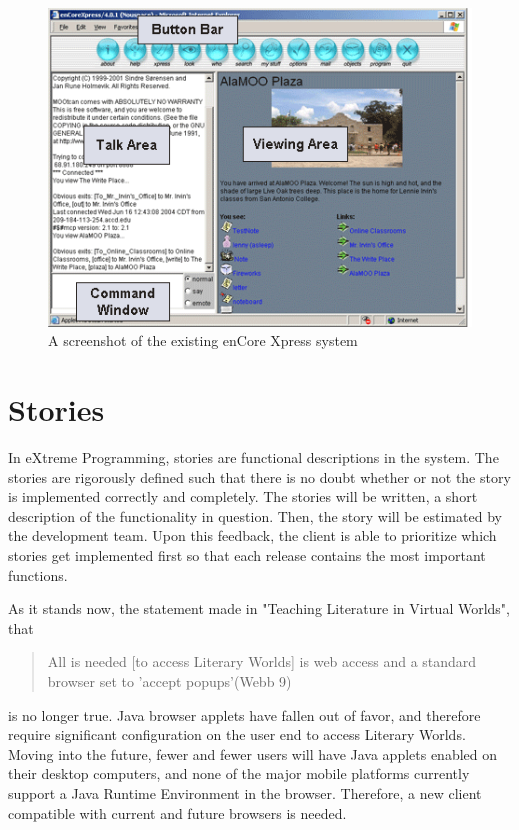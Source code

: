 \documentclass[12pt, letterpaper]{report}
\begin{document}
\par
\begin{figure}[ht!]
\centering
\includegraphics{enCoreScreen.png}
\caption{A screenshot of the existing enCore Xpress system}
\label{overflow}
\end{figure}

%
\chapter{Stories}
\par
In eXtreme Programming, stories are functional descriptions in the system. The stories are rigorously defined such that there is no doubt whether or not the story is implemented correctly and completely. The stories will be written, a short description of the functionality in question. Then, the story will be estimated by the development team. Upon this feedback, the client is able to prioritize which stories get implemented first so that each release contains the most important functions.

\par
As it stands now, the statement made in "Teaching Literature in Virtual Worlds", that 

\begin{quotation}
All is needed [to access Literary Worlds] is web access and a standard browser set to 'accept popups'(Webb 9)
\end{quotation}
is no longer true. Java browser applets have fallen out of favor, and therefore require significant configuration on the user end to access Literary Worlds. Moving into the future, fewer and fewer users will have Java applets enabled on their desktop computers, and none of the major mobile platforms currently support a Java Runtime Environment in the browser. Therefore, a new client compatible with current and future browsers is needed.
\end{document}
